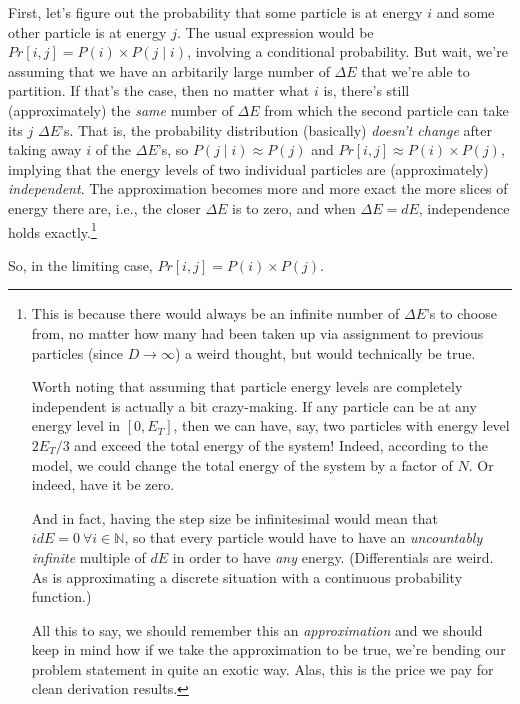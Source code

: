 \documentclass[letterpaper,12pt]{report}
\begin{document}
First, let's figure out the probability that some particle is at energy \(i\) and
some other particle is at energy \(j\). The usual expression would be
\(Pr[i,j] = P(i) \times P(j \mid i)\), involving a conditional probability.
But wait, we're assuming that we have an arbitarily large
number of \(\Delta E\) that we're able to partition. If that's the case, then no matter
what \(i\) is, there's still (approximately) the \emph{same} number of \(\Delta E\) from which
the second particle can take its \(j\) \(\Delta E\)'s. That is, the probability distribution
(basically) \emph{doesn't change} after taking away \(i\) of the \(\Delta E\)'s, so
\(P(j \mid i) \approx P(j)\) and \(Pr[i,j] \approx P(i) \times P(j)\), implying that
the energy levels of two individual particles are (approximately) \emph{independent}. 
The approximation becomes more and more exact the more slices of energy there are, i.e.,
the closer \(\Delta E\) is to zero, 
and when \(\Delta E = dE\), independence holds exactly.\footnote
{
  This is because 
  there would always be an infinite number of \(\Delta E\)'s to choose from, no matter
  how many had been taken up via assignment to previous particles
  (since \(D \rightarrow \infty\))\textemdash{} a weird thought,
  but would technically be true.
  \par
  Worth noting that assuming that particle energy levels are 
  completely independent is actually a bit crazy-making.
  If any particle can be at any energy level in \(\left[0, E_T\right]\), then we can have, say,
  two particles with energy level \(2E_T/3\) and exceed the total energy of the system!
  Indeed, according to the model, we could change the total energy of the system by a factor of
  \(N\). Or indeed, have it be zero.
  \par
  And in fact, having the step size be infinitesimal would mean
  that \(idE = 0 \  \forall i \in \mathbb{N}\), so that every particle would have to have
  an \emph{uncountably infinite} multiple of \(dE\) in order to have \emph{any} energy.
  (Differentials are weird.
  As is approximating a discrete situation with a continuous probability function.)
  \par
  All this to say, we should remember this an \emph{approximation} and we should
  keep in mind how if we take the approximation to be true,
  we're bending our problem statement in quite an exotic way.
  Alas, this is the price we pay for clean derivation results.
}\label{foot:independence-weirdness}

So, in the limiting case, \(Pr[i,j] = P(i) \times P(j)\).
\end{document}
